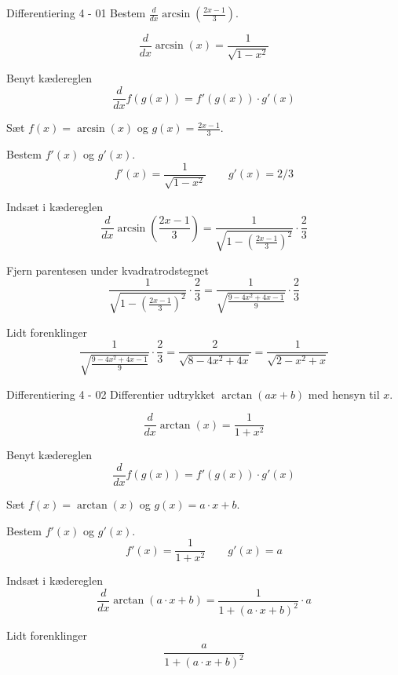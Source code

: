 \documentclass{article}
\begin{document}
\tableofcontents
\newpage


\begin{exercise}{Differentiering 4 - 01}
Bestem $\frac{d}{dx} \arcsin\left( \frac{2x-1}{3} \right)$.



\hint
\[
\frac{d}{dx} \arcsin(x) = \frac{1}{\sqrt{1 - x^ 2}}
\]


\hint
Benyt kædereglen
\[
\frac{d}{dx} f(g(x)) = f'(g(x)) \cdot g'(x)
\]

\hint
Sæt $f(x) = \arcsin(x)$ og $g(x) = \frac{2x - 1}{3}$.

\hint
Bestem $f'(x)$ og $g'(x)$.
\[
f'(x) = \frac{1}{\sqrt{1 - x^ 2}} \qquad g'(x) = 2/3
\]

\hint
Indsæt i kædereglen
\[
\frac{d}{dx} \arcsin\left( \frac{2x-1}{3} \right) = \frac{1}{\sqrt{1 - \left( \frac{2x - 1}{3} \right)^ 2}} \cdot \frac{2}{3}
\]

\hint
Fjern parentesen under kvadratrodstegnet
\[
\frac{1}{\sqrt{1 - \left( \frac{2x - 1}{3} \right)^ 2}} \cdot \frac{2}{3}
= \frac{1}{\sqrt{\frac{9 - 4x^2 + 4x - 1}{9}}} \cdot \frac{2}{3}
\]

\hint
Lidt forenklinger
\[
\frac{1}{\sqrt{\frac{9 - 4x^2 + 4x - 1}{9}}} \cdot \frac{2}{3}
= \frac{2}{\sqrt{8 - 4x^2 + 4x}}
= \frac{1}{\sqrt{2 - x^2 + x}}
\]
\end{exercise}

\begin{exercise}{Differentiering 4 - 02}
Differentier udtrykket $\arctan\left( a x + b \right)$ med hensyn til $x$.


\hint
\[
\frac{d}{dx} \arctan(x) = \frac{1}{1 + x^ 2}
\]


\hint
Benyt kædereglen
\[
\frac{d}{dx} f(g(x)) = f'(g(x)) \cdot g'(x)
\]

\hint
Sæt $f(x) = \arctan(x)$ og $g(x) = a \cdot x + b$.

\hint
Bestem $f'(x)$ og $g'(x)$.
\[
f'(x) = \frac{1}{1 + x^ 2} \qquad g'(x) = a
\]

\hint
Indsæt i kædereglen
\[
\frac{d}{dx} \arctan\left( a \cdot x + b \right) = \frac{1}{1 + \left( a \cdot x + b \right)^2} \cdot a
\]

\hint
Lidt forenklinger
\[
\frac{a}{1 + \left( a \cdot x + b \right)^2}
\]
\end{exercise}
\end{document}
